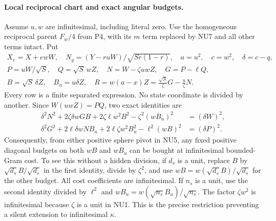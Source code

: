 \paragraph{Local reciprocal chart and exact angular budgets.}
Assume $u,w$ are infinitesimal, including literal zero. Use
the homogeneous reciprocal parent $F_w/4$ from P4, with its
$m$ term replaced by NU7 and all other terms intact. Put
\[
\begin{gathered}
 X_e=X+ewW,\quad N_y=(Y-ruW)/\sqrt{Sr(1-r)},\quad
 a=u^2,\quad c=w^2,\quad \delta=c-q,\\
 P=uW/\sqrt S,\quad Q=\sqrt S\,wZ,\quad
 N=W-\zeta uwZ,\quad G=P-\ell Q,\\
 B=\sqrt S\,\delta Z,\quad B_u=u\delta Z,\quad
 R=w(a-x)Z=\frac{\sqrt S}{\zeta}G-\frac u\zeta N.
\end{gathered}\tag{NU9}
\]
Every row is a finite separated expression. No state coordinate
is divided by another. Since $W(uwZ)=PQ$, two exact identities are
\[
\begin{split}
 \delta^2N^2+2\zeta\delta wGB+2\zeta\ell w^2B^2
                  -\zeta^2(wB_u)^2&=(\delta W)^2,\\
 \delta^2G^2+2\ell\delta wNB_u+2\ell\zeta w^2B_u^2
                  -\ell^2(wB)^2&=(\delta P)^2.
\end{split}\tag{NU10}
\]
Consequently, from either positive sphere pivot in NU5, any fixed
positive diagonal budgets on both $wB$ and $wB_u$ can be bought
at infinitesimal bounded-Gram cost. To see this without a hidden
division, if $d_s$ is a unit, replace $B$ by
$\sqrt{d_s}B/\sqrt{d_s}$ in the first identity, divide by
$\zeta^2$, and use $wB=w(\sqrt{d_s}B)/\sqrt{d_s}$ for the
other budget. All cost coefficients are infinitesimal. If $n_s$
is a unit, use the second identity divided by $\ell^2$ and
$wB_u=w(\sqrt{n_s}B_u)/\sqrt{n_s}$. The factor
$\zeta w^2$ is infinitesimal because $\zeta$ is a unit in
NU1. This is the precise restriction preventing a silent extension
to infinitesimal $\kappa$.

